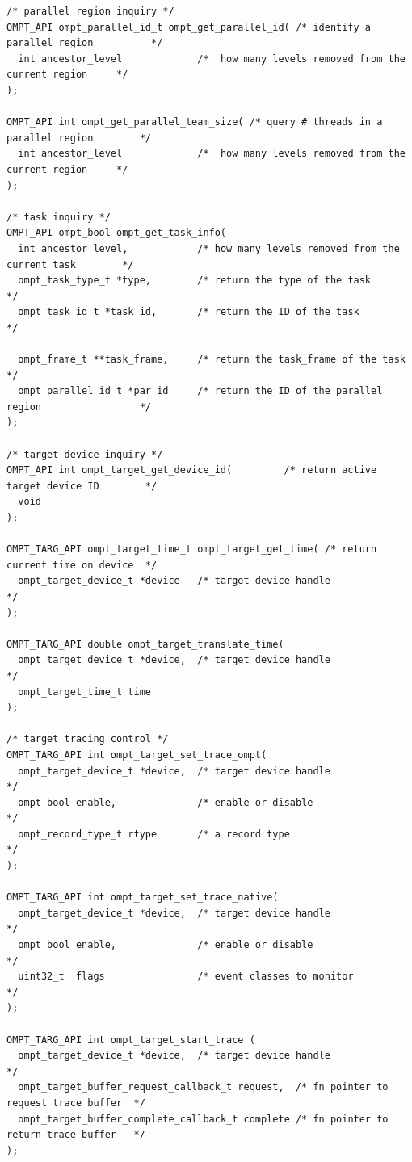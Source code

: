 \documentclass{article}
\begin{document}
{\begin{verbatim}
/* parallel region inquiry */
OMPT_API ompt_parallel_id_t ompt_get_parallel_id( /* identify a parallel region          */
  int ancestor_level             /*  how many levels removed from the current region     */
);

OMPT_API int ompt_get_parallel_team_size( /* query # threads in a parallel region        */
  int ancestor_level             /*  how many levels removed from the current region     */
);

/* task inquiry */
OMPT_API ompt_bool ompt_get_task_info(
  int ancestor_level,            /* how many levels removed from the current task        */
  ompt_task_type_t *type,        /* return the type of the task                          */
  ompt_task_id_t *task_id,       /* return the ID of the task                            */
  
  ompt_frame_t **task_frame,     /* return the task_frame of the task                    */
  ompt_parallel_id_t *par_id     /* return the ID of the parallel region                 */
);

/* target device inquiry */
OMPT_API int ompt_target_get_device_id(         /* return active target device ID        */
  void
);

OMPT_TARG_API ompt_target_time_t ompt_target_get_time( /* return current time on device  */
  ompt_target_device_t *device   /* target device handle                                 */
);

OMPT_TARG_API double ompt_target_translate_time(
  ompt_target_device_t *device,  /* target device handle                                 */
  ompt_target_time_t time
);

/* target tracing control */
OMPT_TARG_API int ompt_target_set_trace_ompt(
  ompt_target_device_t *device,  /* target device handle                                 */
  ompt_bool enable,              /* enable or disable                                    */
  ompt_record_type_t rtype       /* a record type                                        */
);

OMPT_TARG_API int ompt_target_set_trace_native(
  ompt_target_device_t *device,  /* target device handle                                 */
  ompt_bool enable,              /* enable or disable                                    */
  uint32_t  flags                /* event classes to monitor                             */
);

OMPT_TARG_API int ompt_target_start_trace (
  ompt_target_device_t *device,  /* target device handle                                 */
  ompt_target_buffer_request_callback_t request,  /* fn pointer to request trace buffer  */
  ompt_target_buffer_complete_callback_t complete /* fn pointer to return trace buffer   */
);


\end{verbatim}}
\end{document}
